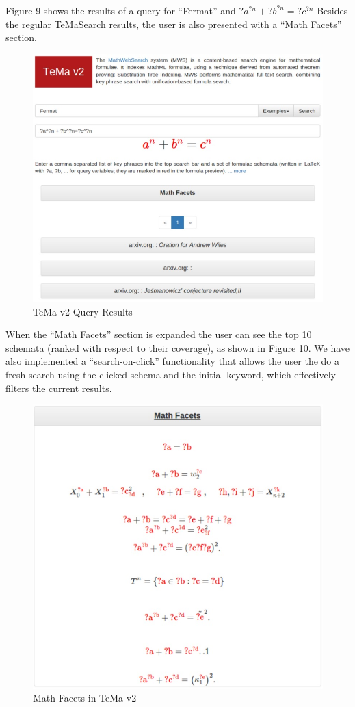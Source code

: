 \documentclass{deliverablereport}
\begin{document}
Figure 9 shows the results of a query for “Fermat” and $?a^{?n}+?b^{?n}=?c^{?n}$ Besides the regular TeMaSearch results, the user is also presented with a “Math Facets” section.

\begin{figure}[H]
\centering
 \includegraphics[scale=0.6]{figure9.jpg}
 \caption{TeMa v2 Query Results}
\end{figure}

When the “Math Facets” section is expanded the user can see the top 10 schemata (ranked with respect to their coverage), as shown in Figure 10. We have also implemented a “search-on-click” functionality that allows the user the do a fresh search using the clicked schema and the initial keyword, which effectively filters the current results.

\begin{figure}[H]
\centering
 \includegraphics[scale=0.8]{figure10.jpg}
 \caption{Math Facets in TeMa v2}
\end{figure}
\end{document}
